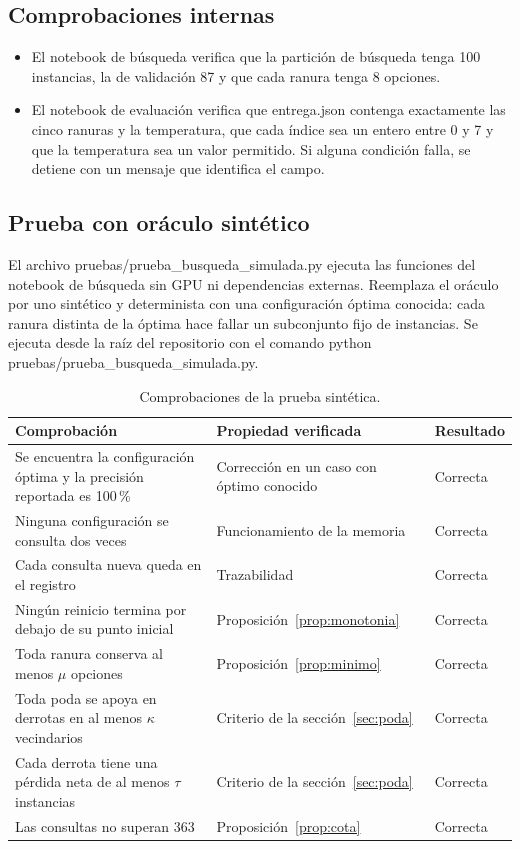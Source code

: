 \documentclass[12pt,letterpaper]{article}
\theoremstyle{definition}
\begin{document}
\subsection{Comprobaciones internas}
\begin{itemize}[leftmargin=*]
\item El notebook de búsqueda verifica que la partición de búsqueda tenga 100 instancias, la de validación 87 y que cada ranura tenga 8 opciones.
\item El notebook de evaluación verifica que entrega.json contenga exactamente las cinco ranuras y la temperatura, que cada índice sea un entero entre 0 y 7 y que la temperatura sea un valor permitido. Si alguna condición falla, se detiene con un mensaje que identifica el campo.
\end{itemize}

\subsection{Prueba con oráculo sintético}
El archivo pruebas/prueba\_busqueda\_simulada.py ejecuta las funciones del notebook de búsqueda sin GPU ni dependencias externas. Reemplaza el oráculo por uno sintético y determinista con una configuración óptima conocida: cada ranura distinta de la óptima hace fallar un subconjunto fijo de instancias. Se ejecuta desde la raíz del repositorio con el comando python pruebas/prueba\_busqueda\_simulada.py.

\begin{table}[H]
\caption{Comprobaciones de la prueba sintética.}
\begin{tabularx}{\textwidth}{@{}Lp{4.6cm}p{2cm}@{}}
\toprule
Comprobación & Propiedad verificada & Resultado \\
\midrule
Se encuentra la configuración óptima y la precisión reportada es 100\,\% & Corrección en un caso con óptimo conocido & Correcta \\
Ninguna configuración se consulta dos veces & Funcionamiento de la memoria & Correcta \\
Cada consulta nueva queda en el registro & Trazabilidad & Correcta \\
Ningún reinicio termina por debajo de su punto inicial & Proposición~\ref{prop:monotonia} & Correcta \\
Toda ranura conserva al menos $\mu$ opciones & Proposición~\ref{prop:minimo} & Correcta \\
Toda poda se apoya en derrotas en al menos $\kappa$ vecindarios & Criterio de la sección~\ref{sec:poda} & Correcta \\
Cada derrota tiene una pérdida neta de al menos $\tau$ instancias & Criterio de la sección~\ref{sec:poda} & Correcta \\
Las consultas no superan 363 & Proposición~\ref{prop:cota} & Correcta \\
\bottomrule
\end{tabularx}
\end{table}
\end{document}
